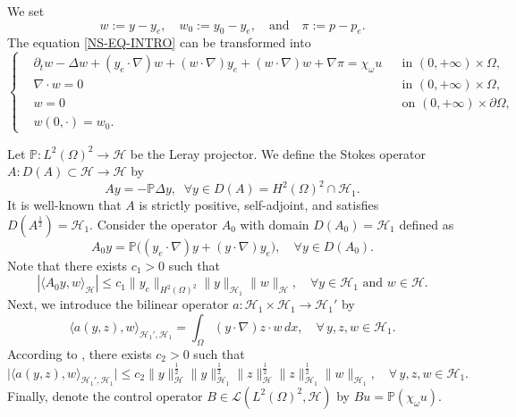 \documentclass[a4paper]{article}
\numberwithin{equation}{section}
\begin{document}
We set
$$w:=y-y_e,\quad w_0:=y_0-y_e, \quad \text{and} \quad\pi:=p-p_e. $$
The equation \eqref{NS-EQ-INTRO} can be transformed into 
\begin{equation}\label{NS-LINEARIZED-orginal-NONLINEAR}
\left\{\begin{aligned}
&\partial_tw-\Delta w +(y_e\cdot\nabla)w +(w\cdot\nabla)y_e+(w\cdot\nabla)w+\nabla \pi = \chi_\omega u&& \text{in } (0,+\infty)\times \Omega,\\
&\nabla\cdot w =0&& \text{in } (0,+\infty)\times \Omega,\\
&w=0&& \text{on } (0,+\infty)\times \partial\Omega,\\
&w(0,\cdot)=w_0.
\end{aligned}\right.
\end{equation}

Let $\mathbb P:L^2(\Omega)^2\to \mathcal H$ be the Leray projector. We define the Stokes operator $A:D(A)\subset \mathcal H\to \mathcal H$ by
$$Ay=-\mathbb P\Delta y,\;\;\forall y\in D(A)=H^2(\Omega )^2\cap \mathcal H_1.$$
It is well-known that $A$ is strictly positive, self-adjoint, and satisfies $D(A^{\frac 12}) =\mathcal{H}_1$. Consider the operator $A_0$ with domain $D(A_0)=\mathcal H_1$ defined as
$$A_0 y = \mathbb P\bigl((y_e \cdot \nabla)y + (y \cdot \nabla)y_e\bigr),\quad \forall y\in D(A_0).$$
Note that there exists $c_1>0$ such that
$$|\langle A_0y,w\rangle_{\mathcal{ H}}|\le c_1\|y_e\|_{H^2(\Omega)^2}\|y\|_{\mathcal H_1}\|w\|_{\mathcal{H}},\quad \forall y\in \mathcal H_1 \text{ and } w\in \mathcal H.$$
Next, we introduce the bilinear operator $ a:\mathcal H_1 \times \mathcal H_1\to  \mathcal H_1'$ by
$$\langle a(y,z),w\rangle_{\mathcal H_1',\mathcal H_1}=\int_\Omega (y\cdot\nabla)z\cdot w\,dx,\quad \forall\, y,z,w\in \mathcal H_1.$$
According to \cite[Proposition 2.2]{X1}, there exists $c_2>0$ such that
\begin{equation}\label{NONlinear-est-NS}
\bigl|\langle a(y,z),w\rangle_{\mathcal H_1',\mathcal H_1}\bigr|\le c_2 \|y\|_{\mathcal H}^{\frac{1}{2}}\|y\|_{\mathcal H_1}^{\frac{1}{2}}\|z\|_{\mathcal H}^{\frac{1}{2}}\|z\|_{\mathcal H_1}^{\frac{1}{2}}\|w\|_{\mathcal H_1},\quad \forall\, y,z,w\in \mathcal H_1.
\end{equation}
Finally, denote the control operator $B\in\mathcal L(L^2(\Omega)^2,\mathcal H)$ by $Bu=\mathbb P(\chi_\omega u)$. \\[-2mm]
\end{document}
